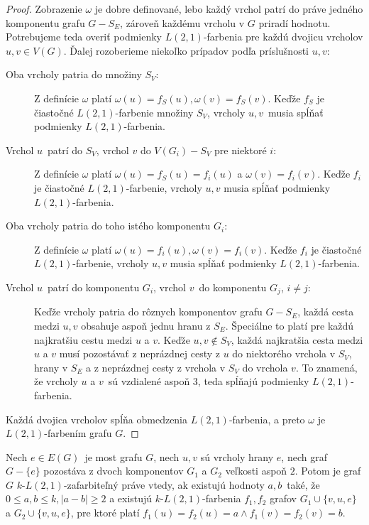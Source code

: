 \begin{proof}
    Zobrazenie $\omega$ je dobre definované, lebo každý vrchol patrí do práve jedného komponentu grafu
    $G - S_E$, zároveň každému vrcholu v $G$ priradí hodnotu. Potrebujeme teda overiť podmienky $L(2,1)$-farbenia
    pre každú dvojicu vrcholov $u, v \in V(G)$. Ďalej rozoberieme niekoľko prípadov podľa príslušnosti $u, v$:

    \begin{description}
        \item[Oba vrcholy patria do množiny $S_V$:] Z definície $\omega$ platí $\omega(u) = f_S(u), \omega(v) = f_S(v)$.
        Keďže $f_S$ je čiastočné $L(2,1)$-farbenie množiny $S_V$, vrcholy $u, v$ musia spĺňať podmienky $L(2,1)$-farbenia.

        \item[Vrchol $u$ patrí do $S_V$, vrchol $v$ do $V(G_i) - S_V$ pre niektoré $i$:] Z definície $\omega$ platí
        $\omega(u) = f_S(u) = f_i(u)$ a $\omega(v) = f_i(v)$. Keďže $f_i$ je čiastočné $L(2, 1)$-farbenie, vrcholy
        $u, v$ musia spĺňať podmienky $L(2,1)$-farbenia.
        
        \item[Oba vrcholy patria do toho istého komponentu $G_i$:] Z definície
        $\omega$ platí $\omega(u) = f_i(u), \omega(v) = f_i(v)$. Keďže $f_i$ je čiastočné $L(2,1)$-farbenie, vrcholy
        $u, v$ musia spĺňať podmienky $L(2,1)$-farbenia.

        \item[Vrchol $u$ patrí do komponentu $G_i$, vrchol $v$ do komponentu $G_j$, $i \neq j$:] Keďže vrcholy patria
        do rôznych komponentov grafu $G - S_E$, každá cesta medzi $u, v$ obsahuje aspoň jednu hranu z $S_E$. Špeciálne
        to platí pre každú najkratšiu cestu medzi $u$ a $v$. Keďže $u, v \notin S_V$, každá najkratšia cesta medzi $u$
        a $v$ musí pozostávať z neprázdnej cesty z $u$ do niektorého vrchola v $S_V$, hrany v $S_E$ a z neprázdnej
        cesty z vrchola v $S_V$ do vrchola $v$. To znamená, že vrcholy $u$ a $v$ sú vzdialené aspoň $3$, teda spĺňajú
        podmienky $L(2,1)$-farbenia.
    \end{description}

    Každá dvojica vrcholov spĺňa obmedzenia $L(2,1)$-farbenia, a preto $\omega$ je $L(2,1)$-farbením grafu $G$. \qedhere

\end{proof}

\begin{dosl}
    Nech $e \in E(G)$ je most grafu $G$, nech $u, v$ sú vrcholy hrany $e$, nech graf $G - \{e\}$ pozostáva z dvoch
    komponentov $G_1$ a $G_2$ veľkosti aspoň $2$. Potom je graf $G$ $k$-$L(2,1)$-zafarbiteľný práve vtedy, ak
    existujú hodnoty $a, b$ také, že $0 \leq a, b \leq k, \left| a - b \right| \ge 2$ a existujú $k$-$L(2,1)$-farbenia $f_1, f_2$ grafov
    $G_1 \cup \{v, u, e\}$ a $G_2 \cup \{v, u, e\}$, pre ktoré platí $f_1(u) = f_2(u) = a \wedge f_1(v) = f_2(v) = b$.
\end{dosl}

